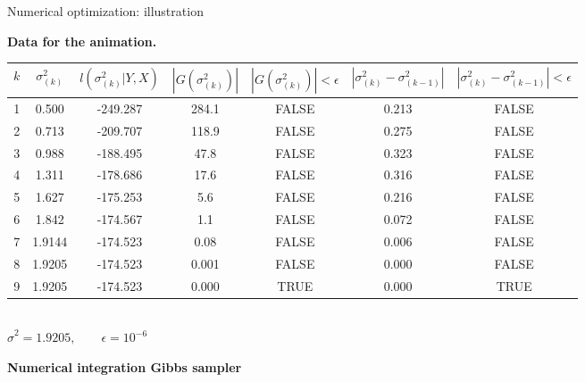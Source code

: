 \documentclass[notes,blackandwhite,mathsans]{beamer}
\begin{document}
\begin{frame}{Numerical optimization: illustration}

\textbf{Data for the animation.}\tiny
\begin{center}
\begin{tabular}{ccccccc}
\toprule
$k$ & $\sigma^2_{(k)}$ & $l(\sigma^2_{(k)}|Y,X)$ & $|G(\sigma^2_{(k)})|$ & $|G(\sigma^2_{(k)})|<\epsilon$ &  $|\sigma^2_{(k)}-\sigma^2_{(k-1)}|$ & $|\sigma^2_{(k)}-\sigma^2_{(k-1)}|<\epsilon$\\
\midrule
1&    0.500& -249.287& 284.1&     FALSE&           0.213&                 FALSE\\
2 &   0.713& -209.707& 118.9&     FALSE&           0.275&                 FALSE\\
3&    0.988& -188.495&  47.8&     FALSE&           0.323&                 FALSE\\
4&    1.311& -178.686&  17.6&     FALSE&           0.316&                 FALSE\\
5&    1.627& -175.253&   5.6&     FALSE&           0.216&                 FALSE\\
6&    1.842& -174.567&   1.1&     FALSE&           0.072&                 FALSE\\
7&    1.9144& -174.523&   0.08&     FALSE&           0.006&                 FALSE\\
8&    1.9205& -174.523&   0.001&     FALSE&           0.000&                 FALSE\\
9&    1.9205& -174.523&   0.000&     TRUE&           0.000&                 TRUE\\
\bottomrule
\end{tabular}\\
$ \hat\sigma^2 =  1.9205, \qquad \epsilon = 10^{-6}$
\end{center}

\end{frame}




{
\begin{frame}

\begin{adjustwidth}{-0.5cm}{0cm}
\vspace{8.3cm}\Large
\textbf{{\color{mcxs2}Numerical integration} {\color{mcxs5}Gibbs sampler}}
\end{adjustwidth}

\end{frame}
}
\end{document}
